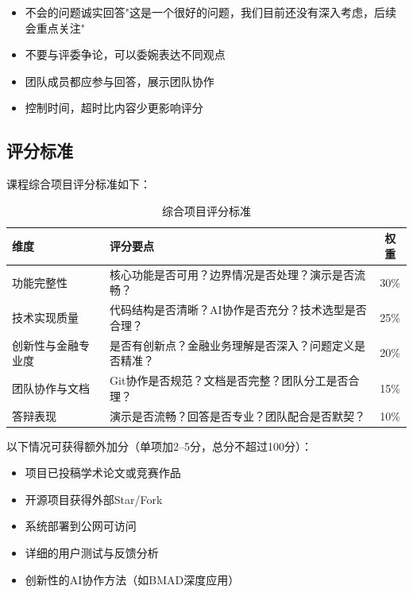 \begin{notebox}[答辩技巧]
\begin{itemize}[leftmargin=1em]
  \item 不会的问题诚实回答"这是一个很好的问题，我们目前还没有深入考虑，后续会重点关注"
  \item 不要与评委争论，可以委婉表达不同观点
  \item 团队成员都应参与回答，展示团队协作
  \item 控制时间，超时比内容少更影响评分
\end{itemize}
\end{notebox}

\subsection{评分标准}

课程综合项目评分标准如下：

\begin{table}[H]
\centering
\begin{tabular}{lp{8cm}c}
\toprule
\textbf{维度} & \textbf{评分要点} & \textbf{权重} \\
\midrule
功能完整性 & 核心功能是否可用？边界情况是否处理？演示是否流畅？ & 30\% \\
技术实现质量 & 代码结构是否清晰？AI协作是否充分？技术选型是否合理？ & 25\% \\
创新性与金融专业度 & 是否有创新点？金融业务理解是否深入？问题定义是否精准？ & 20\% \\
团队协作与文档 & Git协作是否规范？文档是否完整？团队分工是否合理？ & 15\% \\
答辩表现 & 演示是否流畅？回答是否专业？团队配合是否默契？ & 10\% \\
\bottomrule
\end{tabular}
\caption{综合项目评分标准}
\end{table}

\begin{notebox}[加分项]
以下情况可获得额外加分（单项加2--5分，总分不超过100分）：
\begin{itemize}[leftmargin=1em]
  \item 项目已投稿学术论文或竞赛作品
  \item 开源项目获得外部Star/Fork
  \item 系统部署到公网可访问
  \item 详细的用户测试与反馈分析
  \item 创新性的AI协作方法（如BMAD深度应用）
\end{itemize}
\end{notebox}

